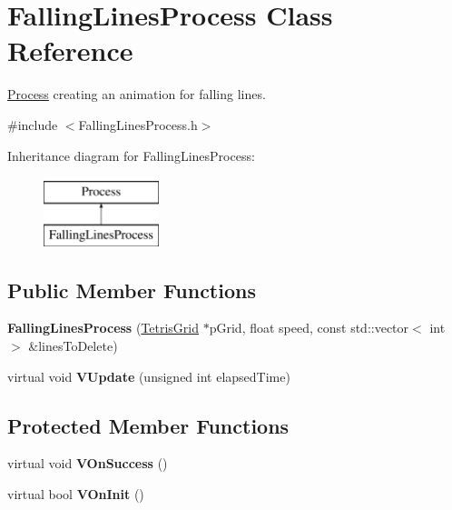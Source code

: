 \hypertarget{classFallingLinesProcess}{\section{Falling\-Lines\-Process Class Reference}
\label{classFallingLinesProcess}
}


\hyperlink{classProcess}{Process} creating an animation for falling lines.  




{\ttfamily \#include $<$Falling\-Lines\-Process.\-h$>$}

Inheritance diagram for Falling\-Lines\-Process\-:\begin{figure}[H]
\begin{center}
\leavevmode
\includegraphics[height=2.000000cm]{classFallingLinesProcess}
\end{center}
\end{figure}
\subsection*{Public Member Functions}
\begin{DoxyCompactItemize}
\item 
\hypertarget{classFallingLinesProcess_aad1e4cc794a7de9cc6aed048fe71718f}{{\bfseries Falling\-Lines\-Process} (\hyperlink{classTetrisGrid}{Tetris\-Grid} $\ast$p\-Grid, float speed, const std\-::vector$<$ int $>$ \&lines\-To\-Delete)}\label{classFallingLinesProcess_aad1e4cc794a7de9cc6aed048fe71718f}

\item 
\hypertarget{classFallingLinesProcess_aeb60fc9d440e6f53b211f5f4b235c4b9}{virtual void {\bfseries V\-Update} (unsigned int elapsed\-Time)}\label{classFallingLinesProcess_aeb60fc9d440e6f53b211f5f4b235c4b9}

\end{DoxyCompactItemize}
\subsection*{Protected Member Functions}
\begin{DoxyCompactItemize}
\item 
\hypertarget{classFallingLinesProcess_a7da1165cea6c50a4006c74d3e7ec0e95}{virtual void {\bfseries V\-On\-Success} ()}\label{classFallingLinesProcess_a7da1165cea6c50a4006c74d3e7ec0e95}

\item 
\hypertarget{classFallingLinesProcess_a16799732f61ba193f7cd528c8f9a6222}{virtual bool {\bfseries V\-On\-Init} ()}\label{classFallingLinesProcess_a16799732f61ba193f7cd528c8f9a6222}

\end{DoxyCompactItemize}


